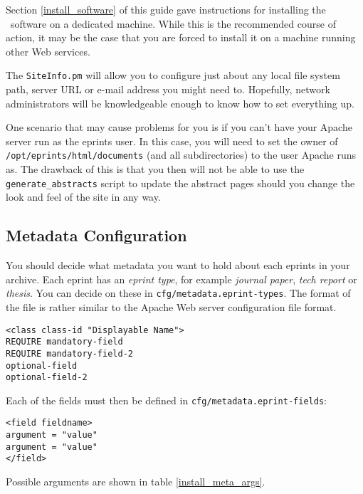 Section \ref{install_software} of this guide gave instructions for installing the \eprints\ software on a dedicated machine. While this is the recommended course of action, it may be the case that you are forced to install it on a machine running other Web services.

The {\tt SiteInfo.pm} will allow you to configure just about any local file system path, server URL or e-mail address you might need to. Hopefully, network administrators will be knowledgeable enough to know how to set everything up.

One scenario that may cause problems for you is if you can't have your Apache server run as the eprints user. In this case, you will need to set the owner of {\tt /opt/eprints/html/documents} (and all subdirectories) to the user Apache runs as. The drawback of this is that you then will not be able to use the {\tt generate\_abstracts} script to update the abstract pages should you change the look and feel of the site in any way.


\subsection{Metadata Configuration}
\label{install_metadata}

You should decide what metadata you want to hold about each eprints in your archive. Each eprint has an \emph{eprint type}, for example \emph{journal paper}, \emph{tech report} or \emph{thesis}. You can decide on these in {\tt cfg/metadata.eprint-types}. The format of the file is rather similar to the Apache Web server configuration file format.

\begin{verbatim}
<class class-id "Displayable Name">
REQUIRE mandatory-field
REQUIRE mandatory-field-2
optional-field
optional-field-2
\end{verbatim}

Each of the fields must then be defined in {\tt cfg/metadata.eprint-fields}:

\begin{verbatim}
<field fieldname>
argument = "value"
argument = "value"
</field>
\end{verbatim}

Possible arguments are shown in table \ref{install_meta_args}.

